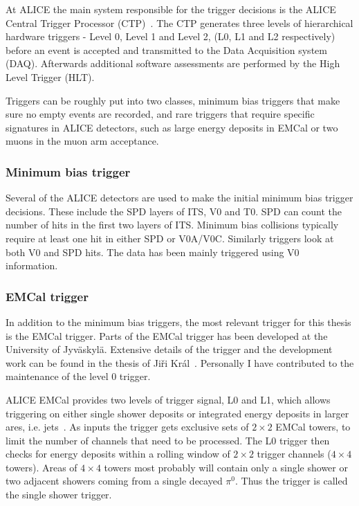 At ALICE the main system responsible for the trigger decisions is the ALICE Central Trigger Processor (CTP)~\cite{Krivda:2016myl}. The CTP generates three levels of hierarchical hardware triggers - Level 0, Level 1 and Level 2, (L0, L1 and L2 respectively) before an event is accepted and transmitted to the Data Acquisition system (DAQ). Afterwards additional software assessments are performed by the High Level Trigger (HLT).

Triggers can be roughly put into two classes, minimum bias triggers that make sure no empty events are recorded, and rare triggers that require specific signatures in ALICE detectors, such as large energy deposits in EMCal or two muons in the muon arm acceptance.

\subsubsection*{Minimum bias trigger}
Several of the ALICE detectors are used to make the initial minimum bias trigger decisions. These include the SPD layers of ITS, V0 and T0. SPD can count the number of hits in the first two layers of ITS. Minimum bias \pp collisions typically require at least one hit in either SPD or V0A/V0C. Similarly \PbPb triggers look at both V0 and SPD hits. The \pPb data has been mainly triggered using V0 information.


\subsubsection*{EMCal trigger}
In addition to the minimum bias triggers, the most relevant trigger for this thesis is the EMCal trigger. Parts of the EMCal trigger has been developed at the University of Jyväskylä. Extensive details of the trigger and the development work can be found in the thesis of Ji\v ri Král~\cite{JiriThesis}. Personally I have contributed to the maintenance of the level 0 trigger.

ALICE EMCal provides two levels of trigger signal, L0 and L1, which allows triggering on either single shower deposits or integrated energy deposits in larger ares, i.e. jets~\cite{KRAL2012261}. As inputs the trigger gets exclusive sets of $2\times2$ EMCal towers, to limit the number of channels that need to be processed. The L0 trigger then checks for energy deposits within a rolling window of $2\times2$ trigger channels ($4\times4$ towers). Areas of $4\times4$ towers most probably will contain only a single shower or two adjacent showers coming from a single decayed $\pi^0$. Thus the trigger is called the single shower trigger. 

